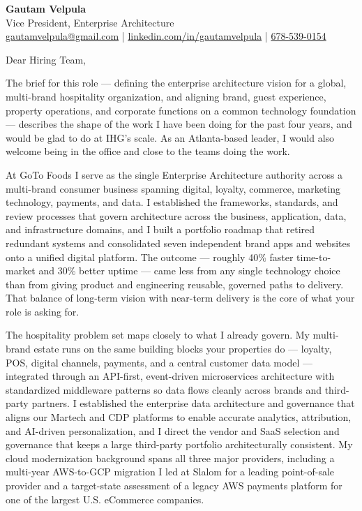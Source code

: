 \documentclass[11pt]{article}
\begin{document}
\begin{center}
    {\LARGE \textbf{Gautam Velpula}} \\[4pt]
    Vice President, Enterprise Architecture \\[6pt]
    \href{mailto:gautamvelpula@gmail.com}{gautamvelpula@gmail.com} \;|\;
    \href{https://www.linkedin.com/in/gautamvelpula}{linkedin.com/in/gautamvelpula} \;|\;
    \href{tel:6785390154}{678-539-0154}
\end{center}

\hrulefill

\vspace{12pt}

Dear Hiring Team,

The brief for this role --- defining the enterprise architecture vision for a global, multi-brand hospitality organization, and aligning brand, guest experience, property operations, and corporate functions on a common technology foundation --- describes the shape of the work I have been doing for the past four years, and would be glad to do at IHG's scale. As an Atlanta-based leader, I would also welcome being in the office and close to the teams doing the work.

At GoTo Foods I serve as the single Enterprise Architecture authority across a multi-brand consumer business spanning digital, loyalty, commerce, marketing technology, payments, and data. I established the frameworks, standards, and review processes that govern architecture across the business, application, data, and infrastructure domains, and I built a portfolio roadmap that retired redundant systems and consolidated seven independent brand apps and websites onto a unified digital platform. The outcome --- roughly 40\% faster time-to-market and 30\% better uptime --- came less from any single technology choice than from giving product and engineering reusable, governed paths to delivery. That balance of long-term vision with near-term delivery is the core of what your role is asking for.

The hospitality problem set maps closely to what I already govern. My multi-brand estate runs on the same building blocks your properties do --- loyalty, POS, digital channels, payments, and a central customer data model --- integrated through an API-first, event-driven microservices architecture with standardized middleware patterns so data flows cleanly across brands and third-party partners. I established the enterprise data architecture and governance that aligns our Martech and CDP platforms to enable accurate analytics, attribution, and AI-driven personalization, and I direct the vendor and SaaS selection and governance that keeps a large third-party portfolio architecturally consistent. My cloud modernization background spans all three major providers, including a multi-year AWS-to-GCP migration I led at Slalom for a leading point-of-sale provider and a target-state assessment of a legacy AWS payments platform for one of the largest U.S. eCommerce companies.
\end{document}
